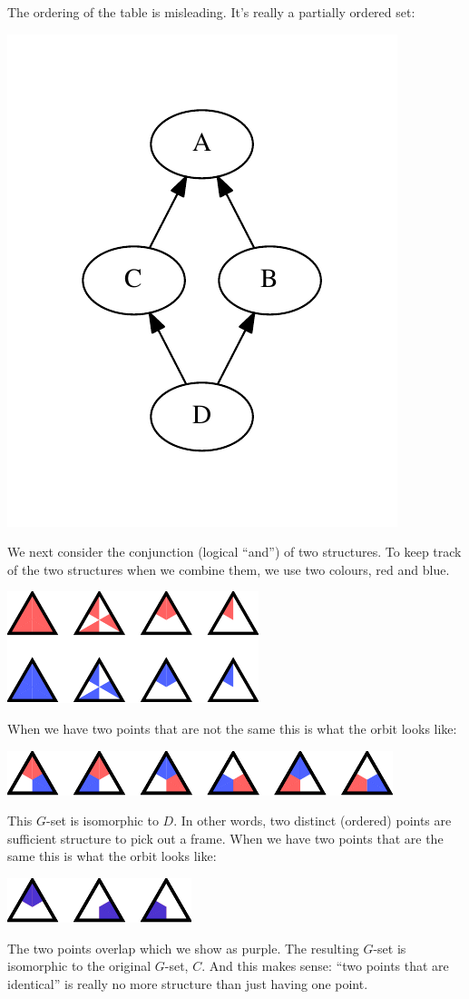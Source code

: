\documentclass[11pt,oneside]{article}
\begin{document}
The ordering of the table is misleading.
It's really a partially ordered set:
\begin{center}
\includegraphics[width=0.3\columnwidth]{subgroups_s3.pdf} 
\end{center}

We next consider the conjunction (logical ``and'')
of two structures.
To keep track of the two structures when we combine them,
we use two colours, red and blue. 
\begin{center}
\includegraphics[]{pic-triangle-pairs.pdf} 
\end{center}
When we have two points that are not the same
this is what the orbit looks like:
\begin{center}
\includegraphics[]{pic-triangle-point-point-ne.pdf} 
\end{center}
This $G$-set is isomorphic to $D$. In other words,
two distinct (ordered) points are sufficient structure to pick
out a frame.
When we have two points that are the same
this is what the orbit looks like:
\begin{center}
\includegraphics[]{pic-triangle-point-point-eq.pdf} 
\end{center}
The two points overlap which we show as purple. The resulting
$G$-set is isomorphic to the original $G$-set, $C.$
And this makes sense: ``two points that are identical''
is really no more structure than just having one point.
\end{document}
